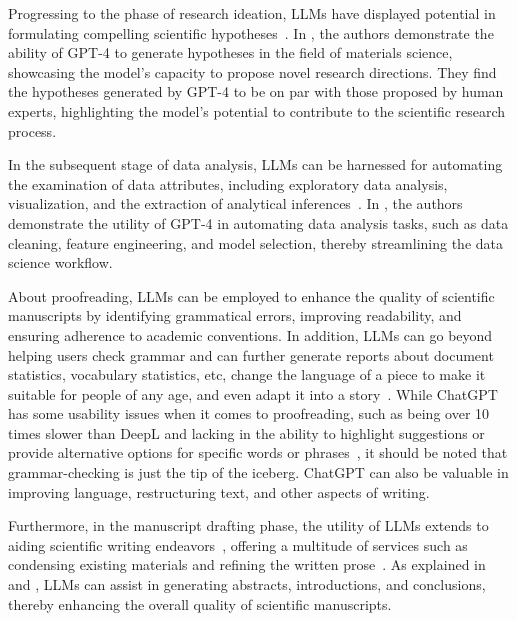 Progressing to the phase of research ideation, LLMs have displayed potential in formulating compelling scientific hypotheses~\cite{park2023chatgpt}.
In \textcite{park2023chatgpt}, the authors demonstrate the ability of GPT-4 to generate hypotheses in the field of materials science, showcasing the model's capacity to propose novel research directions.
They find the hypotheses generated by GPT-4 to be on par with those proposed by human experts, highlighting the model's potential to contribute to the scientific research process.

In the subsequent stage of data analysis, LLMs can be harnessed for automating the examination of data attributes, including exploratory data analysis, visualization, and the extraction of analytical inferences~\cite{cheng2023gpt4dataanalyst}.
In \textcite{hassan2023chatgptdatascientist}, the authors demonstrate the utility of GPT-4 in automating data analysis tasks, such as data cleaning, feature engineering, and model selection, thereby streamlining the data science workflow.

About proofreading, LLMs can be employed to enhance the quality of scientific manuscripts by identifying grammatical errors, improving readability, and ensuring adherence to academic conventions.
In addition, LLMs can go beyond helping users check grammar and can further generate reports about document statistics, vocabulary statistics, etc, change the language of a piece to make it suitable for people of any age, and even adapt it into a story~\cite{kim2022replacegrammarly}.
While ChatGPT has some usability issues when it comes to proofreading, such as being over 10 times slower than DeepL and lacking in the ability to highlight suggestions or provide alternative options for specific words or phrases~\cite{maximov2023englishgrammar}, it should be noted that grammar-checking is just the tip of the iceberg.
ChatGPT can also be valuable in improving language, restructuring text, and other aspects of writing.

Furthermore, in the manuscript drafting phase, the utility of LLMs extends to aiding scientific writing endeavors~\cite{alkaissi2023artificialhallucinations, azaria2023chatgptexperts}, offering a multitude of services such as condensing existing materials and refining the written prose~\cite{buruk2023academicwriting}.
As explained in \textcite{buruk2023academicwriting} and \textcite{alkaissi2023artificialhallucinations}, LLMs can assist in generating abstracts, introductions, and conclusions, thereby enhancing the overall quality of scientific manuscripts.

